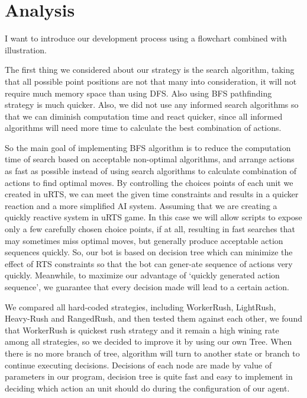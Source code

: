 \section{Analysis}

I want to introduce our development process using a flowchart combined with illustration.



The first thing we considered about our strategy is the search algorithm, taking that all
possible point positions are not that many into consideration, it will not require much memory
space than using DFS. Also using BFS pathfinding strategy is much quicker. Also, we did not use
any informed search algorithms so that we can diminish computation time and react quicker, since
all informed algorithms will need more time to calculate the best combination of actions. 

So the main goal of implementing BFS algorithm is to reduce the computation time of search based
on acceptable non-optimal algorithms, and arrange actions as fast as possible instead of using search
algorithms to calculate combination of actions to find optimal moves. By controlling the choices
points of each unit we created in uRTS, we can meet the given time constraints and results in a
quicker reaction and a more simplified AI system. Assuming that we are creating a quickly reactive
system in uRTS game. In this case we will allow scripts to expose only a few carefully chosen choice
points, if at all, resulting in fast searches that may sometimes miss optimal moves, but generally produce
acceptable action sequences quickly\cite{barriga2018game}. So, our bot is based on decision tree
which can minimize the effect of RTS constraints so that the bot can gener-ate sequence of actions
very quickly. Meanwhile, to maximize our advantage of ‘quickly generated action sequence’, we guarantee
that every decision made will lead to a certain action. 

We compared all hard-coded strategies, including WorkerRush, LightRush, Heavy-Rush and RangedRush, and
then tested them against each other, we found that WorkerRush is quickest rush strategy and it remain
a high wining rate among all strategies, so we decided to improve it by using our own Tree. When there
is no more branch of tree, algorithm will turn to another state or branch to continue executing decisions.
Decisions of each node are made by value of parameters in our program, decision tree is quite fast and
easy to implement in deciding which action an unit should do during the configuration of our agent. 

